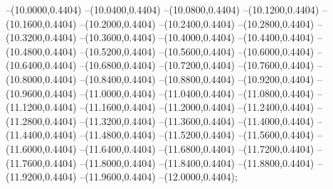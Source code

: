 {	--(10.0000,0.4404)
	--(10.0400,0.4404)
	--(10.0800,0.4404)
	--(10.1200,0.4404)
	--(10.1600,0.4404)
	--(10.2000,0.4404)
	--(10.2400,0.4404)
	--(10.2800,0.4404)
	--(10.3200,0.4404)
	--(10.3600,0.4404)
	--(10.4000,0.4404)
	--(10.4400,0.4404)
	--(10.4800,0.4404)
	--(10.5200,0.4404)
	--(10.5600,0.4404)
	--(10.6000,0.4404)
	--(10.6400,0.4404)
	--(10.6800,0.4404)
	--(10.7200,0.4404)
	--(10.7600,0.4404)
	--(10.8000,0.4404)
	--(10.8400,0.4404)
	--(10.8800,0.4404)
	--(10.9200,0.4404)
	--(10.9600,0.4404)
	--(11.0000,0.4404)
	--(11.0400,0.4404)
	--(11.0800,0.4404)
	--(11.1200,0.4404)
	--(11.1600,0.4404)
	--(11.2000,0.4404)
	--(11.2400,0.4404)
	--(11.2800,0.4404)
	--(11.3200,0.4404)
	--(11.3600,0.4404)
	--(11.4000,0.4404)
	--(11.4400,0.4404)
	--(11.4800,0.4404)
	--(11.5200,0.4404)
	--(11.5600,0.4404)
	--(11.6000,0.4404)
	--(11.6400,0.4404)
	--(11.6800,0.4404)
	--(11.7200,0.4404)
	--(11.7600,0.4404)
	--(11.8000,0.4404)
	--(11.8400,0.4404)
	--(11.8800,0.4404)
	--(11.9200,0.4404)
	--(11.9600,0.4404)
	--(12.0000,0.4404);
}
